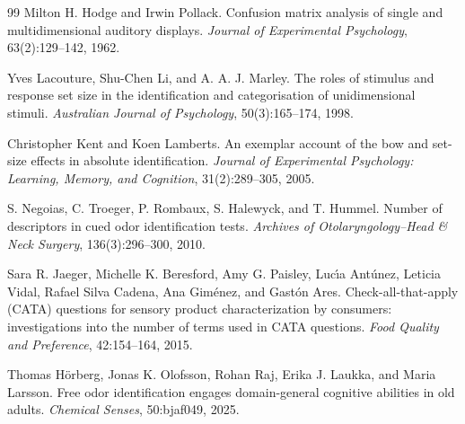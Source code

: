 \documentclass[11pt]{article}
\theoremstyle{italichead}
\begin{document}
\begin{thebibliography}{99}
Milton H. Hodge and Irwin Pollack.
Confusion matrix analysis of single and multidimensional auditory displays.
\emph{Journal of Experimental Psychology}, 63(2):129--142, 1962.

Yves Lacouture, Shu-Chen Li, and A. A. J. Marley.
The roles of stimulus and response set size in the identification and categorisation of
unidimensional stimuli.
\emph{Australian Journal of Psychology}, 50(3):165--174, 1998.

Christopher Kent and Koen Lamberts.
An exemplar account of the bow and set-size effects in absolute identification.
\emph{Journal of Experimental Psychology: Learning, Memory, and Cognition}, 31(2):289--305, 2005.

S. Negoias, C. Troeger, P. Rombaux, S. Halewyck, and T. Hummel.
Number of descriptors in cued odor identification tests.
\emph{Archives of Otolaryngology--Head \& Neck Surgery}, 136(3):296--300, 2010.

Sara R. Jaeger, Michelle K. Beresford, Amy G. Paisley, Luc\'{\i}a Ant\'unez, Leticia Vidal,
Rafael Silva Cadena, Ana Gim\'enez, and Gast\'on Ares.
Check-all-that-apply (CATA) questions for sensory product characterization by consumers:
investigations into the number of terms used in CATA questions.
\emph{Food Quality and Preference}, 42:154--164, 2015.

Thomas H\"orberg, Jonas K. Olofsson, Rohan Raj, Erika J. Laukka, and Maria Larsson.
Free odor identification engages domain-general cognitive abilities in old adults.
\emph{Chemical Senses}, 50:bjaf049, 2025.

\end{thebibliography}
\end{document}
